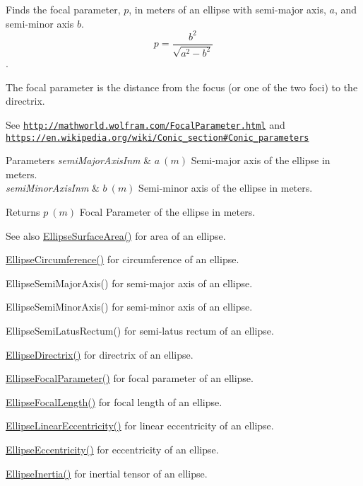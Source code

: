 Finds the focal parameter, $p$, in meters of an ellipse with semi-\/major axis, $a$, and semi-\/minor axis $b$. \[ p=\frac{b^2}{\sqrt{a^2-b^2}} \]. 

The focal parameter is the distance from the focus (or one of the two foci) to the directrix.

See \href{http://mathworld.wolfram.com/FocalParameter.html}{\tt http\+://mathworld.\+wolfram.\+com/\+Focal\+Parameter.\+html} and \href{https://en.wikipedia.org/wiki/Conic_section#Conic_parameters}{\tt https\+://en.\+wikipedia.\+org/wiki/\+Conic\+\_\+section\#\+Conic\+\_\+parameters}


\begin{DoxyParams}{Parameters}
{\em semi\+Major\+Axis\+Inm} & $ a\ (m)$ Semi-\/major axis of the ellipse in meters. \\
\hline
{\em semi\+Minor\+Axis\+Inm} & $ b\ (m)$ Semi-\/minor axis of the ellipse in meters. \\
\hline
\end{DoxyParams}
\begin{DoxyReturn}{Returns}
$ p\ (m)$ Focal Parameter of the ellipse in meters. 
\end{DoxyReturn}
\begin{DoxySeeAlso}{See also}
\mbox{\hyperlink{group___e_g_x_math-_geometry-2_d-_ellipse-_surface_area_ga4ce8c8323e9718ce5458f4ab7f6d823d}{Ellipse\+Surface\+Area()}} for area of an ellipse. 

\mbox{\hyperlink{group___e_g_x_math-_geometry-2_d-_ellipse-_circumference_ga4172802ac674eb53467b44928ac635c7}{Ellipse\+Circumference()}} for circumference of an ellipse. 

Ellipse\+Semi\+Major\+Axis() for semi-\/major axis of an ellipse. 

Ellipse\+Semi\+Minor\+Axis() for semi-\/minor axis of an ellipse. 

Ellipse\+Semi\+Latus\+Rectum() for semi-\/latus rectum of an ellipse. 

\mbox{\hyperlink{group___e_g_x_math-_geometry-2_d-_ellipse-_directrix_gace8f72a8efbc9c18d3eb689151405106}{Ellipse\+Directrix()}} for directrix of an ellipse. 

\mbox{\hyperlink{group___e_g_x_math-_geometry-2_d-_ellipse-_focal_parameter_ga4cd01a38c72c092ef9791351948bf69b}{Ellipse\+Focal\+Parameter()}} for focal parameter of an ellipse. 

\mbox{\hyperlink{group___e_g_x_math-_geometry-2_d-_ellipse-_focal_length_gab8d63de7640c880cfecaeada6f2afdac}{Ellipse\+Focal\+Length()}} for focal length of an ellipse. 

\mbox{\hyperlink{group___e_g_x_math-_geometry-2_d-_ellipse-_linear_eccentricity_gac70b3010e30aa8b73deb50fe2b9b9a91}{Ellipse\+Linear\+Eccentricity()}} for linear eccentricity of an ellipse. 

\mbox{\hyperlink{group___e_g_x_math-_geometry-2_d-_ellipse-_eccentricity_ga6a0a7fba17f782616894cfc447628c33}{Ellipse\+Eccentricity()}} for eccentricity of an ellipse. 

\mbox{\hyperlink{group___e_g_x_math-_geometry-2_d-_ellipse-_inertia_ga10a3049c2f04b50f271fb01dc62e4cf8}{Ellipse\+Inertia()}} for inertial tensor of an ellipse. 
\end{DoxySeeAlso}
